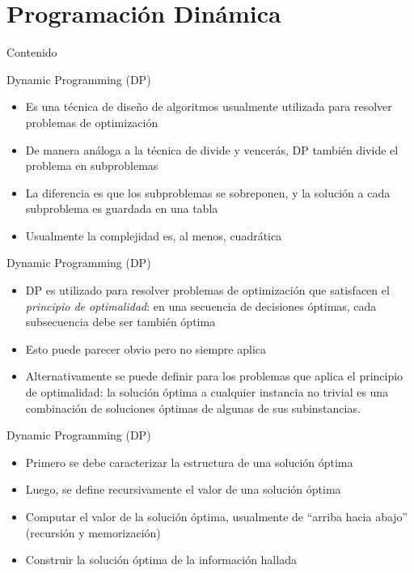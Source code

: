 \documentclass[]{beamer}
\begin{document}
\section{Programaci\'on Din\'amica}
\begin{frame}{Contenido}
\tableofcontents[currentsection]
\end{frame}

\begin{frame}{Dynamic Programming (DP)}
  \begin{itemize}
    \item Es una t\'ecnica de dise\~no de algoritmos usualmente utilizada para resolver problemas de optimizaci\'on
      \pause
    \item De manera an\'aloga a la t\'ecnica de divide y vencer\'as, DP tambi\'en divide el problema en subproblemas
      \pause
    \item La diferencia es que los subproblemas se sobreponen, y la soluci\'on a cada subproblema es guardada en una tabla
      \pause
    \item Usualmente la complejidad es, al menos, cuadr\'atica
  \end{itemize}
\end{frame}

\begin{frame}{Dynamic Programming (DP)}
  \begin{itemize}
    \item DP es utilizado para resolver problemas de optimizaci\'on que satisfacen el \textit{principio de optimalidad}: en una secuencia de decisiones \'optimas, cada subsecuencia debe ser tambi\'en \'optima
      \pause
    \item Esto puede parecer obvio pero no siempre aplica
      \pause
    \item Alternativamente se puede definir para los problemas que aplica el principio de optimalidad: la soluci\'on \'optima a cualquier instancia no trivial es una combinaci\'on de soluciones \'optimas de algunas de sus subinstancias. 
  \end{itemize}
\end{frame}

\begin{frame}{Dynamic Programming (DP)}
  \begin{itemize}
    \item Primero se debe caracterizar la estructura de una soluci\'on \'optima
      \pause
    \item Luego, se define recursivamente el valor de una soluci\'on \'optima
      \pause
    \item Computar el valor de la soluci\'on \'optima, usualmente de ``arriba hacia abajo'' (recursi\'on y memorizaci\'on)
      \pause
    \item Construir la soluci\'on \'optima de la informaci\'on hallada
  \end{itemize}
\end{frame}
\end{document}
